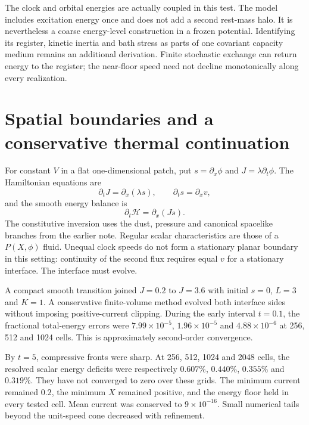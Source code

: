 \documentclass[11pt]{article}
\begin{document}
The clock and orbital energies are actually coupled in this test. The
model includes excitation energy once and does not add a second rest-mass
halo. It is nevertheless a coarse energy-level construction in a frozen
potential. Identifying its register, kinetic inertia and bath stress as
parts of one covariant capacity medium remains an additional derivation.
Finite stochastic exchange can return energy to the register; the
near-floor speed need not decline monotonically along every realization.

\section{Spatial boundaries and a conservative thermal continuation}
For constant $V$ in a flat one-dimensional patch, put
$s=\partial_x\phi$ and $J=\lambda\partial_t\phi$. The Hamiltonian equations are
\begin{equation}
 \partial_tJ=\partial_x(\lambda s),\qquad
 \partial_ts=\partial_xv,
\end{equation}
and the smooth energy balance is
\begin{equation}
 \partial_t\mathcal H=\partial_x(Js).
\end{equation}
The constitutive inversion uses the dust, pressure and canonical spacelike
branches from the earlier note. Regular scalar characteristics are those
of a $P(X,\phi)$ fluid\cite{Garriga}. Unequal clock speeds do not form a
stationary planar boundary in this setting: continuity of the second flux
requires equal $v$ for a stationary interface. The interface must evolve.

A compact smooth transition joined $J=0.2$ to $J=3.6$ with initial $s=0$,
$L=3$ and $K=1$. A conservative finite-volume method evolved both interface
sides without imposing positive-current clipping. During the early interval
$t=0.1$, the fractional total-energy errors were
$7.99\times10^{-5}$, $1.96\times10^{-5}$ and $4.88\times10^{-6}$ at
256, 512 and 1024 cells. This is approximately second-order convergence.

By $t=5$, compressive fronts were sharp. At 256, 512, 1024 and 2048 cells,
the resolved scalar energy deficits were respectively $0.607\%$, $0.440\%$,
$0.355\%$ and $0.319\%$. They have not converged to zero over these grids.
The minimum current remained $0.2$, the minimum $X$ remained positive,
and the energy floor held in every tested cell. Mean current was conserved
to $9\times10^{-16}$. Small numerical tails beyond the unit-speed cone
decreased with refinement.
\end{document}
